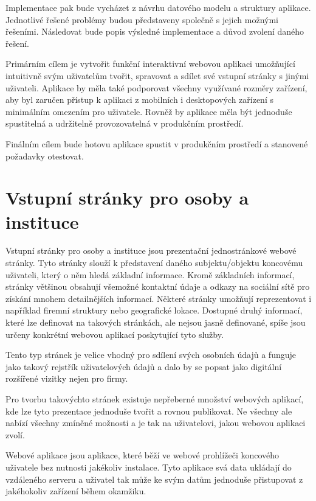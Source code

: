 Implementace pak bude vycházet z návrhu datového modelu a struktury aplikace.
Jednotlivé řešené problémy budou představeny společně s jejich možnými řešeními.
Následovat bude popis výsledné implementace a důvod zvolení daného řešení.

Primárním cílem je vytvořit funkční interaktivní webovou aplikaci umožňující intuitivně svým uživatelům
tvořit, spravovat a sdílet své vstupní stránky s jinými uživateli.
Aplikace by měla také podporovat všechny využívané rozměry zařízení, aby byl zaručen přístup k aplikaci z mobilních
i desktopových zařízení s minimálním omezením pro uživatele.
Rovněž by aplikace měla být jednoduše spustitelná a udržitelně provozovatelná v produkčním prostředí.

Finálním cílem bude hotovu aplikace spustit v produkčním prostředí a stanovené požadavky otestovat.

\section{Vstupní stránky pro osoby a instituce}

Vstupní stránky pro osoby a instituce jsou prezentační jednostránkové webové stránky.
Tyto stránky slouží k představení daného subjektu/objektu koncovému uživateli, který o něm hledá základní
informace.
Kromě základních informací, stránky většinou obsahují všemožné kontaktní údaje a odkazy na sociální sítě pro
získání mnohem detailnějších informací.
Některé stránky umožňují reprezentovat i například firemní struktury nebo geografické lokace.
Dostupné druhý informací, které lze definovat na takových stránkách, ale nejsou jasně definované, spíše jsou
určeny konkrétní webovou aplikací poskytující tyto služby.

Tento typ stránek je velice vhodný pro sdílení svých osobních údajů a funguje jako takový rejstřík uživatelových
údajů a dalo by se popsat jako digitální rozšířené vizitky nejen pro firmy.

Pro tvorbu takovýchto stránek existuje nepřeberné množství webových aplikací, kde lze
tyto prezentace jednoduše tvořit a rovnou publikovat.
Ne všechny ale nabízí všechny zmíněné možnosti a je tak na uživatelovi, jakou webovou aplikaci zvolí.

Webové aplikace jsou aplikace, které běží ve webové prohlížeči koncového uživatele bez nutnosti jakékoliv instalace.
Tyto aplikace svá data ukládají do vzdáleného serveru a
uživatel tak může ke svým datům jednoduše přistupovat z jakéhokoliv zařízení během okamžiku.

